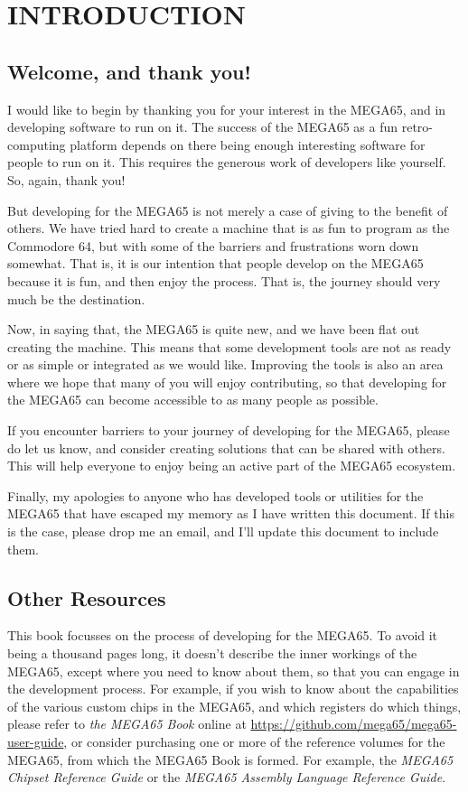 \cleardoublepage
{}

\part{INTRODUCTION}

\chapter{Welcome, and thank you!}

I would like to begin by thanking you for your interest in the MEGA65,
and in developing software to run on it. The success of the MEGA65 as
a fun retro-computing platform depends on there being enough
interesting software for people to run on it.  This requires the
generous work of developers like yourself. So, again, thank you!

But developing for the MEGA65 is not merely a case of giving to the
benefit of others. We have tried hard to create a machine that is as
fun to program as the Commodore 64, but with some of the barriers
and frustrations worn down somewhat.  That is, it is our intention
that people develop on the MEGA65 because it is fun, and then enjoy
the process.  That is, the journey should very much be the
destination.

Now, in saying that, the MEGA65 is quite new, and we have been flat
out creating the machine. This means that some development tools are
not as ready or as simple or integrated as we would like.  Improving
the tools is also an area where we hope that many of you will enjoy
contributing, so that developing for the MEGA65 can become accessible
to as many people as possible.

If you encounter barriers to your
journey of developing for the MEGA65, please do let us know, and
consider creating solutions that can be shared with others.  This will
help everyone to enjoy being an active part of the MEGA65 ecosystem.

Finally, my apologies to anyone who has developed tools or utilities
for the MEGA65 that have escaped my memory as I have written this
document.  If this is the case, please drop me an email, and I'll
update this document to include them.

\chapter{Other Resources}

This book focusses on the process of developing for the MEGA65.  To
avoid it being a thousand pages long, it doesn't describe the inner
workings of the MEGA65, except where you need to know about them, so
that you can engage in the development process.  For example, if you
wish to know about the capabilities of the various custom chips in the
MEGA65, and which registers do which things, please refer to {\em the
MEGA65 Book} online
at \url{https://github.com/mega65/mega65-user-guide}, or consider
purchasing one or more of the reference volumes for the MEGA65, from
which the MEGA65 Book is formed.  For example, the {\em MEGA65 Chipset
Reference Guide} or the {\em MEGA65 Assembly Language Reference Guide}.

